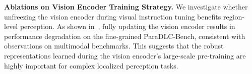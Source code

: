 \noindent
\textbf{Ablations on Vision Encoder Training Strategy.}
We investigate whether unfreezing the vision encoder during visual instruction tuning benefits region-level perception. As shown in~, fully updating the vision encoder results in performance degradation on the fine-grained ParaDLC-Bench, consistent with observations on multimodal benchmarks. This suggests that the robust representations learned during the vision encoder's large-scale pre-training are highly important for complex localized perception tasks.



